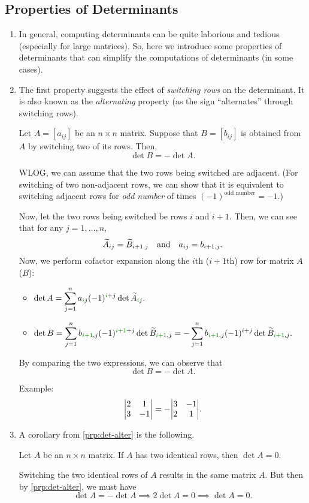 \subsection{Properties of Determinants}
\label{subsect:det-prop}
\begin{enumerate}
\item In general, computing determinants can be quite laborious and tedious
(especially for large matrices). So, here we introduce some properties of
determinants that can simplify the computations of determinants (in some
cases).

\item The first property suggests the effect of \emph{switching rows} on the
determinant. It is also known as the \emph{alternating} property (as the sign
``alternates'' through switching rows).
\begin{proposition}[Alternating]
\label{prp:det-alter}
Let \(A=[a_{ij}]\) be an \(n\times  n\) matrix. Suppose that \(B=[b_{ij}]\) is obtained from
\(A\) by switching two of its rows. Then,
\[
\det B=-\det A.
\]
\end{proposition}
\begin{pf}
WLOG, we can assume that the two rows being switched are adjacent. (For
switching of two non-adjacent rows, we can show that it is equivalent to
switching adjacent rows for \emph{odd number} of times 
\((-1)^{\text{odd number}}=-1\).)

Now, let the two rows being switched be rows \(i\) and \(i+1\). Then, we can
see that for any \(j=1,\dotsc,n\),
\[
\widetilde{A}_{ij}=\widetilde{B}_{i+1,j}
\qqtext{and}
a_{ij}=b_{i+1,j}.
\]
Now, we perform cofactor expansion along the \(i\)th (\(i+1\)th) row for matrix
\(A\) (\(B\)):
\begin{itemize}
\item \(\displaystyle 
\det A
=\sum_{j=1}^{n}a_{\gc{i}j}(-1)^{\gc{i}+j}\det \widetilde{A}_{\gc{i}j}.
\)
\item \(\displaystyle 
\det B
=\sum_{j=1}^{n}b_{\gc{i+1},j}(-1)^{\gc{i+1}+j}\det \widetilde{B}_{\gc{i+1},j}
=-\sum_{j=1}^{n}b_{\gc{i+1},j}(-1)^{i+j}\det \widetilde{B}_{\gc{i+1},j}.
\)
\end{itemize}
By comparing the two expressions, we can observe that
\[
\det B=-\det A.
\]
\end{pf}

Example:
\[
\mqty|2&1\\3&-1|
=-\mqty|3&-1\\2&1|.
\]
\item A corollary from \cref{prp:det-alter} is the following.
\begin{corollary}
\label{cor:two-identical-rows-zero-det}
Let \(A\) be an \(n\times  n\) matrix. If \(A\) has two identical rows, then
\(\det A=0\).
\end{corollary}
\begin{pf}
Switching the two identical rows of \(A\) results in the same matrix \(A\). But
then by \cref{prp:det-alter}, we must have
\[
\det A=-\det A\implies 2\det A=0\implies \det A=0.
\]
\end{pf}


\end{enumerate}
